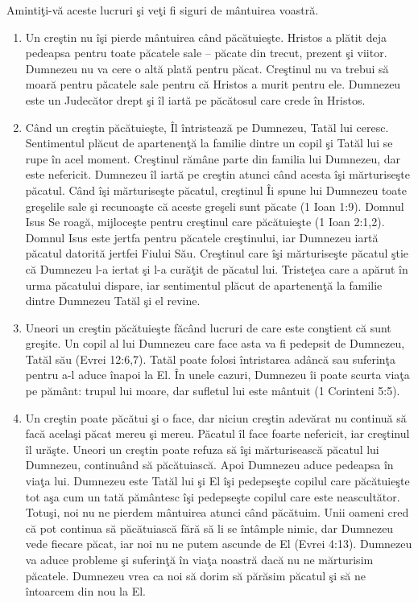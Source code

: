 Amintiţi-vă aceste lucruri şi veţi fi siguri de mântuirea voastră.

\begin{enumerate}

	\item Un creştin nu îşi pierde mântuirea când păcătuieşte. Hristos a plătit deja pedeapsa pentru toate păcatele sale – păcate din trecut, prezent şi viitor. Dumnezeu nu va cere o altă plată pentru păcat. Creştinul nu va trebui să moară pentru păcatele sale pentru că Hristos a murit pentru ele. Dumnezeu este un Judecător drept şi îl iartă pe păcătosul care crede în Hristos.
	
	\item Când un creştin păcătuieşte, Îl întristează pe Dumnezeu, Tatăl lui ceresc. Sentimentul plăcut de apartenenţă la familie dintre un copil şi Tatăl lui se rupe în acel moment. Creştinul rămâne parte din familia lui Dumnezeu, dar este nefericit. Dumnezeu îl iartă pe creştin atunci când acesta îşi mărturiseşte păcatul. Când îşi mărturiseşte păcatul, creştinul Îi spune lui Dumnezeu toate greşelile sale şi recunoaşte că aceste greşeli sunt păcate (1 Ioan 1:9). Domnul Isus Se roagă, mijloceşte pentru creştinul care păcătuieşte (1 Ioan 2:1,2). Domnul Isus este jertfa pentru păcatele creştinului, iar Dumnezeu iartă păcatul datorită jertfei Fiului Său. Creştinul care îşi mărturiseşte păcatul ştie că Dumnezeu l-a iertat şi l-a curăţit de păcatul lui. Tristeţea care a apărut în urma păcatului dispare, iar sentimentul plăcut de apartenenţă la familie dintre Dumnezeu Tatăl şi el revine. 
	
	\item Uneori un creştin păcătuieşte făcând lucruri de care este conştient că sunt greşite. Un copil al lui Dumnezeu care face asta va fi pedepsit de Dumnezeu, Tatăl său (Evrei 12:6,7). Tatăl poate folosi întristarea adâncă sau suferinţa pentru a-l aduce înapoi la El. În unele cazuri, Dumnezeu îi poate scurta viaţa pe pământ: trupul lui moare, dar sufletul lui este mântuit (1 Corinteni 5:5).
	
	\item Un creştin poate păcătui şi o face, dar niciun creştin adevărat nu continuă să facă acelaşi păcat mereu şi mereu. Păcatul îl face foarte nefericit, iar creştinul îl urăşte. Uneori un creştin poate refuza să îşi mărturisească păcatul lui Dumnezeu, continuând să păcătuiască. Apoi Dumnezeu aduce pedeapsa în viaţa lui. Dumnezeu este Tatăl lui şi El îşi pedepseşte copilul care păcătuieşte tot aşa cum un tată pământesc îşi pedepseşte copilul care este neascultător. Totuşi, noi nu ne pierdem mântuirea atunci când păcătuim. Unii oameni cred că pot continua să păcătuiască fără să li se întâmple nimic, dar Dumnezeu vede fiecare păcat, iar noi nu ne putem ascunde de El (Evrei 4:13). Dumnezeu va aduce probleme şi suferinţă în viaţa noastră dacă nu ne mărturisim păcatele. Dumnezeu vrea ca noi să dorim să părăsim păcatul şi să ne întoarcem din nou la El.
	

\end{enumerate}
